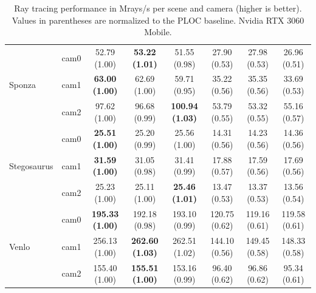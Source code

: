 \begin{table}[!ht]
{\begin{tabular}{llcccccc}
        \hline
        \multirow{3}{*}{Sponza}
        & cam0 & 52.79 (1.00) & \textbf{53.22 (1.01)} & 51.55 (0.98) & 27.90 (0.53) & 27.98 (0.53) & 26.96 (0.51) \\
        & cam1 & \textbf{63.00 (1.00)} & 62.69 (1.00) & 59.71 (0.95) & 35.22 (0.56) & 35.35 (0.56) & 33.69 (0.53) \\
        & cam2 & 97.62 (1.00) & 96.68 (0.99) & \textbf{100.94 (1.03)} & 53.79 (0.55) & 53.32 (0.55) & 55.16 (0.57) \\

        \hline
        \multirow{3}{*}{Stegosaurus}
        & cam0 & \textbf{25.51 (1.00)} & 25.20 (0.99) & 25.56 (1.00) & 14.31 (0.56) & 14.23 (0.56) & 14.36 (0.56) \\
        & cam1 & \textbf{31.59 (1.00)} & 31.05 (0.98) & 31.41 (0.99) & 17.88 (0.57) & 17.59 (0.56) & 17.69 (0.56) \\
        & cam2 & 25.23 (1.00) & 25.11 (1.00) & \textbf{25.46 (1.01)} & 13.47 (0.53) & 13.37 (0.53) & 13.56 (0.54) \\

        \hline
        \multirow{3}{*}{Venlo}
        & cam0 & \textbf{195.33 (1.00)} & 192.18 (0.98) & 193.10 (0.99) & 120.75 (0.62) & 119.16 (0.61) & 119.58 (0.61) \\
        & cam1 & 256.13 (1.00) & \textbf{262.60 (1.03)} & 262.51 (1.02) & 144.10 (0.56) & 149.45 (0.58) & 148.33 (0.58) \\
        & cam2 & 155.40 (1.00) & \textbf{155.51 (1.00)} & 153.16 (0.99) & 96.40 (0.62) & 96.86 (0.62) & 95.34 (0.61) \\

        \hline
    \end{tabular}
    }
    \caption{Ray tracing performance in Mrays/s per scene and camera (higher is better). Values in parentheses are normalized to the PLOC baseline. Nvidia RTX 3060 Mobile.}
    \label{tab:trace-performance-cameras-3060}
\end{table}

